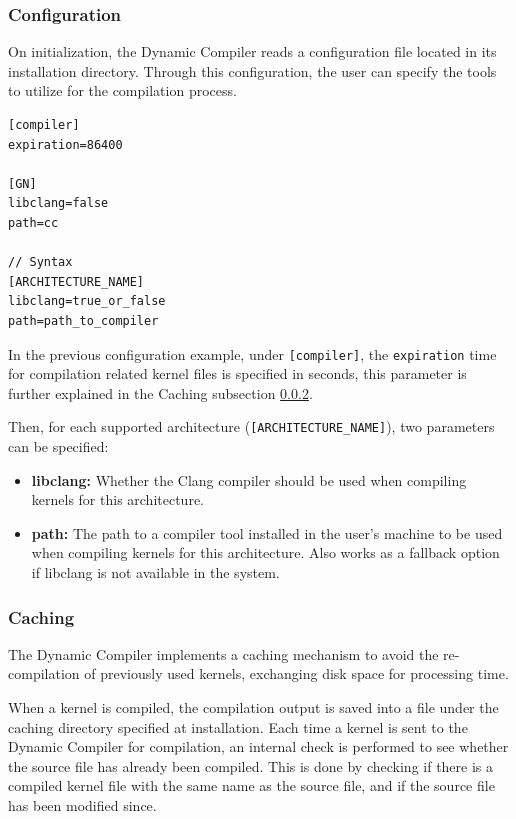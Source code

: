 \subsubsection{Configuration} \label{HHAL:DynamicCompilerConfiguration}

On initialization, the Dynamic Compiler reads a configuration file located in its installation directory. Through this configuration, the user can specify the tools to utilize for the compilation process.

\begin{lstlisting}[style=CStyle, caption=HHAL Dynamic Compiler - Configuration example]
[compiler]
expiration=86400

[GN]
libclang=false
path=cc

// Syntax
[ARCHITECTURE_NAME]
libclang=true_or_false
path=path_to_compiler
\end{lstlisting}

In the previous configuration example, under \texttt{[compiler]}, the \texttt{expiration} time for compilation related kernel files is specified in seconds, this parameter is further explained in the Caching subsection \ref{HHAL:DynamicCompilerBinaryCaching}.

Then, for each supported architecture (\texttt{[ARCHITECTURE\_NAME]}), two parameters can be specified:
\begin{itemize}
    \item \textbf{libclang:} Whether the Clang compiler should be used when compiling kernels for this architecture.
    \item \textbf{path:} The path to a compiler tool installed in the user's machine to be used when compiling kernels for this architecture. Also works as a fallback option if libclang is not available in the system.
\end{itemize}

\subsubsection{Caching} \label{HHAL:DynamicCompilerBinaryCaching}

The Dynamic Compiler implements a caching mechanism to avoid the re-compilation of previously used kernels, exchanging disk space for processing time.

When a kernel is compiled, the compilation output is saved into a file under the caching directory specified at installation. Each time a kernel is sent to the Dynamic Compiler for compilation, an internal check is performed to see whether the source file has already been compiled. This is done by checking if there is a compiled kernel file with the same name as the source file, and if the source file has been modified since.


